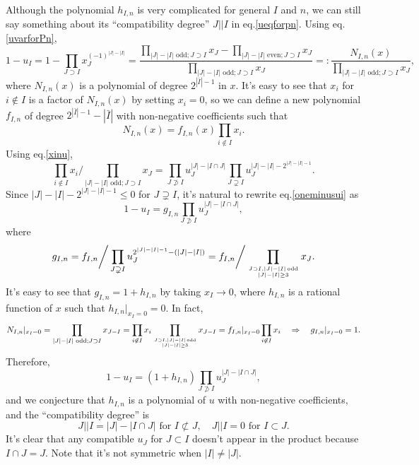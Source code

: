 \documentclass[hidelinks,12pt]{article}
\begin{document}
Although the polynomial $h_{I,n}$ is very complicated for general $I$ and $n$, we can still say something about its  ``compatibility degree'' $J||I$ in eq.\eqref{ueqforpn}.
Using eq.\eqref{uvarforPn}, 
\begin{equation}\label{oneminusui}
1-u_I=1-\prod_{J\supset I}x_J^{(-1)^{|J|-|I|}}=\frac{\prod_{|J|-|I| \text{ odd}; J\supset I}x_J-\prod_{|J|-|I| \text{ even}; J\supset I}x_J}{\prod_{|J|-|I| \text{ odd}; J\supset I}x_J}=:\frac{N_{I,n}(x)}{\prod_{|J|-|I| \text{ odd}; J\supset I}x_J},
\end{equation}
where $N_{I,n}(x)$ is a polynomial of degree $2^{|\bar I|-1}$ in $x$.
It's easy to see that $x_i$ for $i\not\in I$ is a factor of $N_{I,n}(x)$ by setting $x_i=0$, so we can define a new polynomial $f_{I,n}$ of degree $2^{|\bar I|-1}-|\bar I|$ with non-negative coefficients such that
\[
N_{I,n}(x)=f_{I,n}(x)\prod_{i\not\in I}x_i.
\]
Using eq.\eqref{xinu},
\[
\prod_{i\not\in I}x_i\bigg/\prod_{|J|-|I| \text{ odd}; J\supset I}x_J
=\prod_{J\not\supset I} u_J^{|J|-|I\cap J|}\prod_{J\supsetneq I} u_J^{|J|-|I|-2^{|J|-|I|-1}}.
\]
Since $|J|-|I|-2^{|J|-|I|-1}\leq 0$ for $J\supsetneq I$, it's natural to rewrite eq.\eqref{oneminusui} as
\[
1-u_I=g_{I,n}\prod_{J\not\supset I} u_J^{|J|-|I\cap J|},
\]
where 
\[
g_{I,n}=f_{I,n}\bigg /\prod_{J\supsetneq I} u_J^{2^{|J|-|I|-1}-(|J|-|I|)}
=f_{I,n}\bigg /\prod_{J\supset I, |J|-|I|\, \text{odd}\atop{|J|-|I|\geq 3}} x_J.
\]
It's easy to see that $g_{I,n}=1+h_{I,n}$ by taking $x_I\to 0$, where $h_{I,n}$ is a rational function of $x$ such that $h_{I,n}|_{x_I=0}=0$. In fact, 
\[
N_{I,n}|_{x_I=0}=\prod_{|J|-|I| \text{ odd}; J\supset I}x_{J-I}=\prod_{i\not\in I}x_i\prod_{J\supset I, |J|-|I|\, \text{odd}\atop{|J|-|I|\geq 3}} x_{J-I}=f_{I,n}|_{x_I=0}\prod_{i\not\in I}x_i\quad \Rightarrow\quad g_{I,n}|_{x_I=0}=1.
\]
Therefore, 
\begin{equation}\label{ueqofPn}
1-u_I=(1+h_{I,n})\prod_{J\not\supset I} u_J^{|J|-|I\cap J|},
\end{equation}
and we conjecture that $h_{I,n}$ is a polynomial of $u$ with non-negative coefficients, and the ``compatibility degree'' is 
\[
J||I=|J|-|I\cap J|\text{ for $I\not\subset J$},\quad  J||I=0 \text{ for $I\subset J$}.
\]
It's clear that any compatible $u_J$ for $J\subset I$ doesn't appear in the product because $I\cap J=J$.
Note that it's not symmetric when $|I|\neq |J|$.
\end{document}
